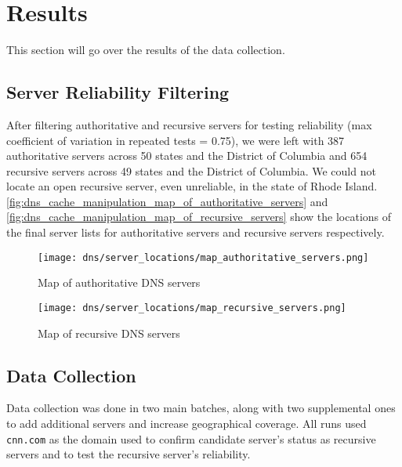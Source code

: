 \section{Results}\label{sec:dns_results} %

This section will go over the results of the data collection. %

\subsection{Server Reliability Filtering}

After filtering authoritative and recursive \dns servers for testing reliability (max coefficient of variation in repeated tests = 0.75), we were left with 387 authoritative servers across 50 states and the District of Columbia and 654 recursive servers across 49 states and the District of Columbia. We could not locate an open recursive \dns server, even unreliable, in the state of Rhode Island. \autoref{fig:dns_cache_manipulation_map_of_authoritative_servers} and \autoref{fig:dns_cache_manipulation_map_of_recursive_servers} show the locations of the final server lists for authoritative servers and recursive servers respectively.

\begin{figure}[H]
    \centering
    \texttt{[image: dns/server\_locations/map\_authoritative\_servers.png]}
    \caption{Map of authoritative DNS servers}
    \label{fig:dns_cache_manipulation_map_of_authoritative_servers}
\end{figure}

\begin{figure}[H]
    \centering
    \texttt{[image: dns/server\_locations/map\_recursive\_servers.png]}
    \caption{Map of recursive DNS servers}
    \label{fig:dns_cache_manipulation_map_of_recursive_servers}
\end{figure}

\subsection{Data Collection}

Data collection was done in two main batches, along with two supplemental ones to add additional servers and increase geographical coverage. All runs used \texttt{cnn.com} as the domain used to confirm candidate server's status as recursive servers and to test the recursive server's reliability.


